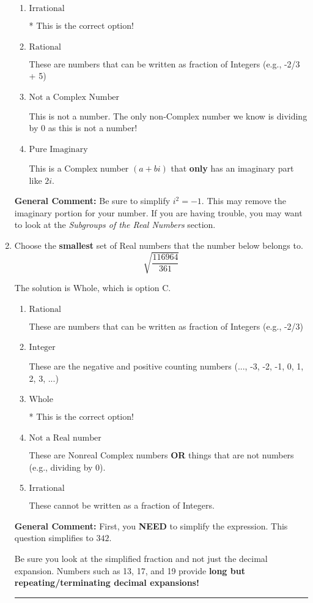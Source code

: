 \documentclass{extbook}[14pt]
\newcommand{\litem}[1]{\item #1

\rule{\textwidth}{0.4pt}}
\begin{document}
\begin{enumerate}
{\begin{enumerate}[label=\Alph*.]
This is a Complex number $(a+bi)$ that is not Real (has $i$ as part of the number).
\item \( \text{Irrational} \)

* This is the correct option!
\item \( \text{Rational} \)

These are numbers that can be written as fraction of Integers (e.g., -2/3 + 5)
\item \( \text{Not a Complex Number} \)

This is not a number. The only non-Complex number we know is dividing by 0 as this is not a number!
\item \( \text{Pure Imaginary} \)

This is a Complex number $(a+bi)$ that \textbf{only} has an imaginary part like $2i$.
\end{enumerate}

\textbf{General Comment:} Be sure to simplify $i^2 = -1$. This may remove the imaginary portion for your number. If you are having trouble, you may want to look at the \textit{Subgroups of the Real Numbers} section.
}
\litem{
Choose the \textbf{smallest} set of Real numbers that the number below belongs to.
\[ \sqrt{\frac{116964}{361}} \]

The solution is \( \text{Whole} \), which is option C.\begin{enumerate}[label=\Alph*.]
\item \( \text{Rational} \)

These are numbers that can be written as fraction of Integers (e.g., -2/3)
\item \( \text{Integer} \)

These are the negative and positive counting numbers (..., -3, -2, -1, 0, 1, 2, 3, ...)
\item \( \text{Whole} \)

* This is the correct option!
\item \( \text{Not a Real number} \)

These are Nonreal Complex numbers \textbf{OR} things that are not numbers (e.g., dividing by 0).
\item \( \text{Irrational} \)

These cannot be written as a fraction of Integers.
\end{enumerate}

\textbf{General Comment:} First, you \textbf{NEED} to simplify the expression. This question simplifies to $342$. 
 
 Be sure you look at the simplified fraction and not just the decimal expansion. Numbers such as 13, 17, and 19 provide \textbf{long but repeating/terminating decimal expansions!} 
 
}
\end{enumerate}
\end{document}
